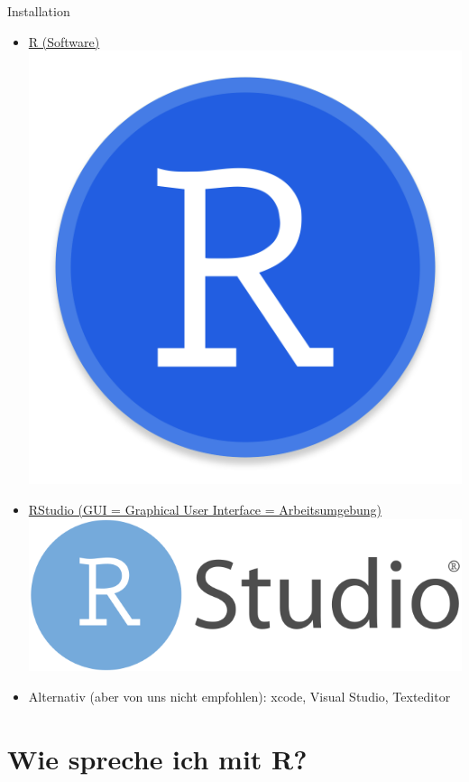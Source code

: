 \documentclass[xcolor=dvipsnames, aspectratio = 169]{beamer}
\begin{document}
\begin{frame}{Installation}
	\begin{itemize}
		\item \href{https://www.r-project.org/}{R (Software)  \includegraphics[scale=0.01]{include/r-logo}}
		\item \href{https://www.rstudio.com/}{RStudio (GUI = Graphical User Interface = Arbeitsumgebung)  \includegraphics[scale=0.04]{include/rstudio-logo}}
		\item Alternativ (aber von uns nicht empfohlen): xcode, Visual Studio, Texteditor
	\end{itemize}
	
\end{frame}

\section{Wie spreche ich mit R?}
\end{document}
